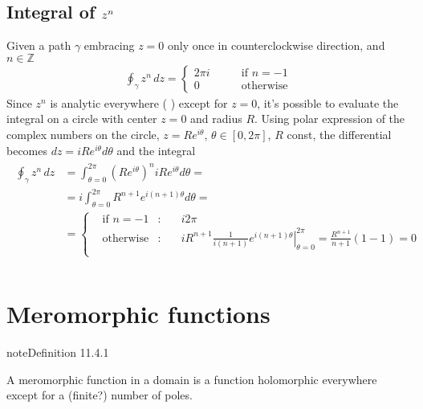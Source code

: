 \documentclass[letterpaper,10pt,english]{jupyterBook}
\begin{document}
\subsection{Integral of \protect\(z^n\protect\)}
\label{\detokenize{ch/complex/analysis:integral-of-z-n}}\label{\detokenize{ch/complex/analysis:complex-analysis-useful-int-path-independence-z-n}}
\sphinxAtStartPar
Given a path \(\gamma\) embracing \(z=0\) only once in counter\sphinxhyphen{}clockwise direction, and \(n \in \mathbb{Z}\)
\begin{equation*}
\begin{split}\oint_{\gamma} z^n \, dz = \left\{ \begin{aligned}  2 \pi i & \qquad \text{if $n = -1$} \\ 0 & \qquad \text{otherwise} \end{aligned} \right.\end{split}
\end{equation*}
\sphinxAtStartPar
Since \(z^n\) is analytic everywhere ( ) except for \(z=0\), it’s possible to evaluate the integral on a circle with center \(z=0\) and radius \(R\). Using polar expression of the complex numbers on the circle, \(z = R e^{i \theta}\), \(\theta \in [0, 2 \pi]\), \(R\) const, the differential becomes \(dz = i R e^{i \theta} d \theta\) and the integral
\begin{equation*}
\begin{split}\begin{aligned}
\oint_{\gamma} z^n \, dz
  & = \int_{\theta=0}^{2 \pi} \left( R e^{i\theta}\right)^n i R e^{i \theta} d \theta = \\
  & = i \int_{\theta=0}^{2 \pi} R^{n+1} e^{i (n+1) \theta} d \theta = \\
  & = \left\{ \begin{aligned}
    & \text{if $n=-1$} & : & \quad  i 2 \pi \\
    & \text{otherwise} & : & \quad  i R^{n+1} \frac{1}{i(n+1)} \left.e^{i(n+1)\theta}\right|_{\theta=0}^{2\pi} = \frac{R^{n+1}}{n+1} ( 1 - 1 ) = 0 \\
  \end{aligned} \right.\\
\end{aligned}\end{split}
\end{equation*}

\section{Meromorphic functions}
\label{\detokenize{ch/complex/analysis:meromorphic-functions}}\label{\detokenize{ch/complex/analysis:complex-analysis-mero-fun}}\label{ch/complex/analysis:definition-1}
\begin{sphinxadmonition}{note}{Definition 11.4.1}



\sphinxAtStartPar
A meromorphic function in a domain is a function holomorphic everywhere except for a (finite?) number of poles. 
\end{sphinxadmonition}
\end{document}
